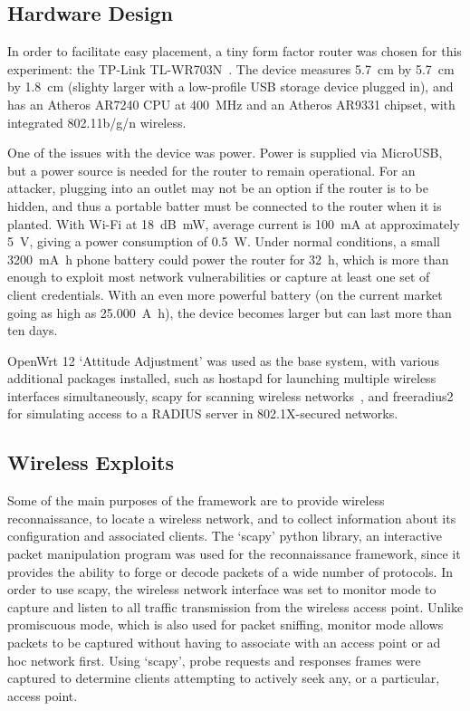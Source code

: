 \documentclass[journal, compsoc]{IEEEtran}
\begin{document}
\subsection{Hardware Design}
\label{sec:design-hardware}

In order to facilitate easy placement, a tiny form factor router was
chosen for this experiment: the TP-Link TL-WR703N~\cite{tpwr703n}. The
device measures \SI{5.7}{\cm} by \SI{5.7}{\cm} by \SI{1.8}{\cm}
(slighty larger with a low-profile USB storage device plugged in), and
has an Atheros AR7240 CPU at \SI{400}{\MHz} and an Atheros AR9331
chipset, with integrated 802.11b/g/n wireless.

One of the issues with the device was power. Power is supplied via
MicroUSB, but a power source is needed for the router to remain
operational. For an attacker, plugging into an outlet may not be an
option if the router is to be hidden, and thus a portable batter must
be connected to the router when it is planted. With Wi-Fi at
\SI{18}{dB.mW}, average current is \SI{100}{\mA} at approximately
\SI{5}{\volt}, giving a power consumption of \SI{0.5}{\W}. Under
normal conditions, a small \SI{3200}{\mA.\hour} phone battery could
power the router for \SI{32}{\hour}, which is more than enough to
exploit most network vulnerabilities or capture at least one set of
client credentials. With an even more powerful battery (on the current
market going as high as \SI{25,000}{\A.\hour}), the device becomes
larger but can last more than ten days.

OpenWrt 12 `Attitude Adjustment' was used as the base system, with
various additional packages installed, such as hostapd for launching
multiple wireless interfaces simultaneously, scapy for scanning
wireless networks~\cite{keeble2014passive}, and freeradius2 for
simulating access to a RADIUS server in 802.1X-secured networks.

\subsection{Wireless Exploits}
\label{sec:design-exploits}

Some of the main purposes of the framework are to provide wireless
reconnaissance, to locate a wireless network, and to collect
information about its configuration and associated clients. The `scapy'
python library, an interactive packet manipulation program was used
for the reconnaissance framework, since it provides the ability to
forge or decode packets of a wide number of protocols. In order to use
scapy, the wireless network interface was set to monitor mode to
capture and listen to all traffic transmission from the wireless
access point. Unlike promiscuous mode, which is also used for packet
sniffing, monitor mode allows packets to be captured without having to
associate with an access point or ad hoc network first. Using `scapy',
probe requests and responses frames were captured to determine clients
attempting to actively seek any, or a particular, access point.
\end{document}
